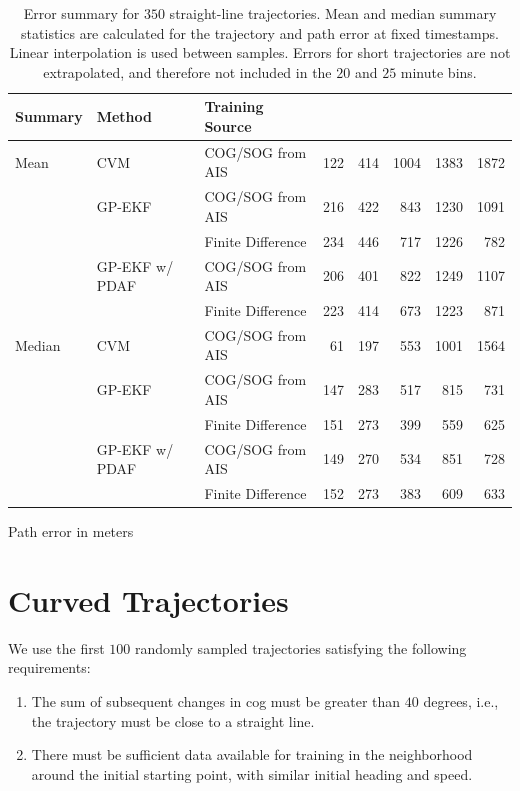 \begin{table}[h]
\begin{subtable}{\textwidth}
{\begin{tabular}{lllrrrrr}
                Summary & Method         & Training Source   &     &     &      &      &      \\
                \midrule
                Mean    & CVM            & COG/SOG from AIS  & 122 & 414 & 1004 & 1383 & 1872 \\
                        & GP-EKF         & COG/SOG from AIS  & 216 & 422 & 843  & 1230 & 1091 \\
                        &                & Finite Difference & 234 & 446 & 717  & 1226 & 782  \\
                        & GP-EKF w/ PDAF & COG/SOG from AIS  & 206 & 401 & 822  & 1249 & 1107 \\
                        &                & Finite Difference & 223 & 414 & 673  & 1223 & 871  \\
                \midrule
                Median  & CVM            & COG/SOG from AIS  & 61  & 197 & 553  & 1001 & 1564 \\
                        & GP-EKF         & COG/SOG from AIS  & 147 & 283 & 517  & 815  & 731  \\
                        &                & Finite Difference & 151 & 273 & 399  & 559  & 625  \\
                        & GP-EKF w/ PDAF & COG/SOG from AIS  & 149 & 270 & 534  & 851  & 728  \\
                        &                & Finite Difference & 152 & 273 & 383  & 609  & 633  \\
                \bottomrule
            \end{tabular}
        }
        \caption{Path error in meters}
        \label{table:stats_straight_path_err}
    \end{subtable}
    \caption{Error summary for $350$ straight-line trajectories. Mean and median summary statistics are calculated for the trajectory and path error at fixed timestamps. Linear interpolation is used between samples. Errors for short trajectories are not extrapolated, and therefore not included in the $20$ and $25$ minute bins.}
    \label{table:stats_straigh_line_error}
\end{table}



\section{Curved Trajectories}
We use the first $100$ randomly sampled trajectories satisfying the following requirements:
\begin{enumerate}
    \item The sum of subsequent changes in \acrshort{cog} must be greater than $40$ degrees, i.e., the trajectory must be close to a straight line.
    \item There must be sufficient data available for training in the neighborhood around the initial starting point, with similar initial heading and speed.
\end{enumerate}

